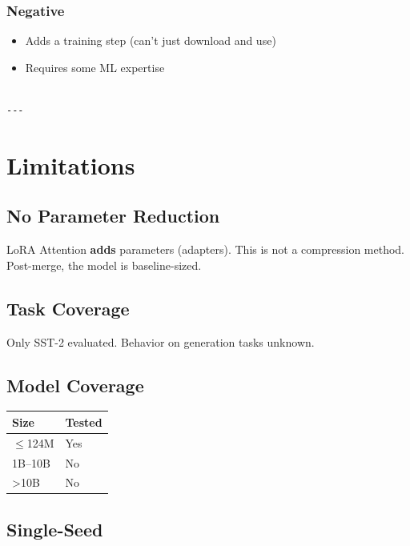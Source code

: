 \subsubsection{Negative}
\begin{itemize}
\item Adds a training step (can't just download and use)
\item Requires some ML expertise
\end{itemize}
\begin{lstlisting}

---
\end{lstlisting}

\section{Limitations}

\subsection{No Parameter Reduction}

LoRA Attention \textbf{adds} parameters (adapters). This is not a compression 
method. Post-merge, the model is baseline-sized.

\subsection{Task Coverage}

Only SST-2 evaluated. Behavior on generation tasks unknown.

\subsection{Model Coverage}

\begin{table}[H]
\centering
\small
\begin{tabular}{ll}
\toprule
\textbf{Size} & \textbf{Tested} \\
\midrule
$\le$124M & Yes \\
1B--10B & No \\
\textgreater{}10B & No \\
\bottomrule
\end{tabular}
\end{table}

\subsection{Single-Seed}

